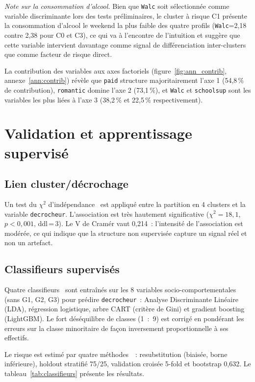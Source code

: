 \documentclass[twocolumn]{article}
\begin{document}
\textit{Note sur la consommation d'alcool.} Bien que \texttt{Walc} soit sélectionnée comme variable discriminante lors des tests préliminaires, le cluster à risque C1 présente la consommation d'alcool le weekend la plus faible des quatre profils (\texttt{Walc}=2,18 contre 2,38 pour C0 et C3), ce qui va à l'encontre de l'intuition et suggère que cette variable intervient davantage comme signal de différenciation inter-clusters que comme facteur de risque direct.

La contribution des variables aux axes factoriels (figure~\ref{fig:ann_contrib}, annexe~\ref{ann:contrib}) révèle que \texttt{paid} structure majoritairement l'axe 1 (54,8\,\% de contribution), \texttt{romantic} domine l'axe 2 (73,1\,\%), et \texttt{Walc} et \texttt{schoolsup} sont les variables les plus liées à l'axe 3 (38,2\,\% et 22,5\,\% respectivement).

\section{Validation et apprentissage supervisé}
\label{sec:validation}

\subsection{Lien cluster/décrochage}

Un test du $\chi^2$ d'indépendance~\cite[Ch.\,12, \S\,12.1]{polySY02} est appliqué entre la partition en 4 clusters et la variable \texttt{decrocheur}. L'association est très hautement significative ($\chi^2 = 18{,}1$, $p < 0{,}001$, ddl\,=\,3). Le V de Cramér vaut 0,214~: l'intensité de l'association est modérée, ce qui indique que la structure non supervisée capture un signal réel et non un artefact.

\subsection{Classifieurs supervisés}

Quatre classifieurs~\cite[Ch.\,10--12]{polySY09} sont entraînés sur les 8 variables socio-comportementales (sans G1, G2, G3) pour prédire \texttt{decrocheur}~: Analyse Discriminante Linéaire (LDA), régression logistique, arbre CART (critère de Gini) et gradient boosting (LightGBM). Le fort déséquilibre de classes (1~:~9) est corrigé en pondérant les erreurs sur la classe minoritaire de façon inversement proportionnelle à ses effectifs.

Le risque est estimé par quatre méthodes~\cite[Ch.\,13]{polySY09}~: resubstitution (biaisée, borne inférieure), holdout stratifié 75/25, validation croisée 5-fold et bootstrap 0,632. Le tableau~\ref{tab:classifieurs} présente les résultats.
\end{document}
